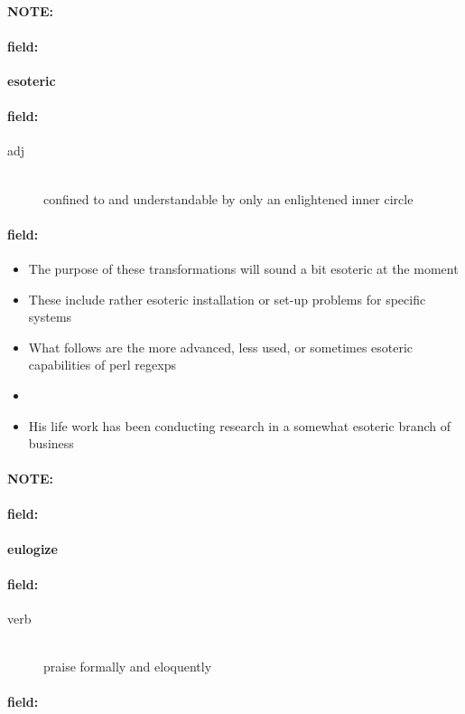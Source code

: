 \documentclass[12pt]{article}
\newenvironment{note}{\paragraph{NOTE:}}{}
\newenvironment{field}{\paragraph{field:}}{}
\begin{document}
\begin{note}
\begin{field}
\textbf{\large esoteric}
\end{field}


\begin{field}
\begin{description}
\item[adj] \hfill \\ 
confined to and understandable by only an enlightened inner circle

\end{description}
\end{field}

\begin{field}
\begin{itemize}
\item The purpose of these transformations will sound a bit esoteric at the moment
\item These include rather esoteric installation or set-up problems for specific systems
\item What follows are the more advanced, less used, or sometimes esoteric capabilities of perl regexps
\item 
\item His life work has been conducting research in a somewhat esoteric branch of business
\end{itemize}
\end{field}
\end{note}
\begin{note}
\begin{field}
\textbf{\large eulogize}
\end{field}


\begin{field}
\begin{description}
\item[verb] \hfill \\ 
praise formally and eloquently

\end{description}
\end{field}

\begin{field}
\end{field}
\end{note}
\end{document}
